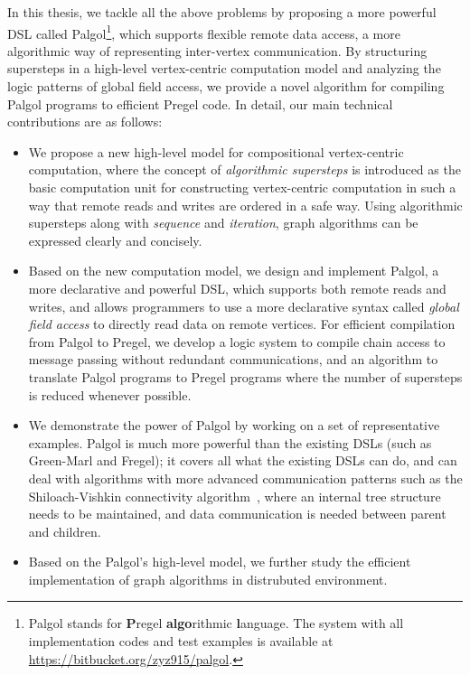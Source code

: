 \documentclass{sokendai_thesis} %
\begin{document}
In this thesis, we tackle all the above problems by proposing a more powerful DSL called Palgol\footnote{Palgol stands for {\bf P}regel {\bf algo}rithmic {\bf l}anguage.
The system with all implementation codes and test examples is available at \url{https://bitbucket.org/zyz915/palgol}.}, which supports flexible remote data access, a more algorithmic way of representing inter-vertex communication.
By structuring supersteps in a high-level vertex-centric computation model and analyzing the logic patterns of global field access, we provide a novel algorithm for compiling Palgol programs to efficient Pregel code. 
In detail, our main technical contributions are as follows:
\begin{itemize}
\item
 We propose a new high-level model for compositional vertex-centric computation, where the concept of \emph{algorithmic supersteps} is introduced as the basic computation unit for constructing vertex-centric computation in such a way that remote reads and writes are ordered in a safe way.
 Using algorithmic supersteps along with \emph{sequence} and \emph{iteration}, graph algorithms can be expressed clearly and concisely.
\item
 Based on the new computation model, we design and implement Palgol, a more declarative and powerful DSL, which supports both remote reads and writes, and allows programmers to use a more declarative syntax called \emph{global field access} to directly read data on remote vertices.
 For efficient compilation from Palgol to Pregel, we develop a logic system to compile chain access to message passing without redundant communications, and an algorithm to translate Palgol programs to Pregel programs where the number of supersteps is reduced whenever possible.
\item
 We demonstrate the power of Palgol by working on a set of representative examples.
 Palgol is much more powerful than the existing DSLs (such as Green-Marl and Fregel); it covers all what the existing DSLs can do, and can deal with algorithms with more advanced communication patterns such as the Shiloach-Vishkin connectivity algorithm~\cite{connectivity}, where an internal tree structure needs to be maintained, and data communication is needed between parent and children.
\item
 Based on the Palgol's high-level model, we further study the efficient implementation of graph algorithms in distrubuted environment.

\end{itemize}
\end{document}
